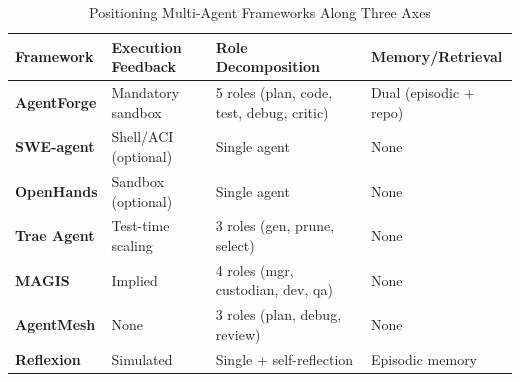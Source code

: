 \documentclass[journal]{IEEEtran}
\begin{document}
\begin{table}[t]
\centering
\caption{Positioning Multi-Agent Frameworks Along Three Axes}
\label{tab:frameworks_axes}
\small
\setlength{\tabcolsep}{5pt} %
\renewcommand{\arraystretch}{1.25} %

\begin{tabular}{@{} l p{3.5cm} p{3.5cm} p{3.5cm} @{}}
\toprule
\textbf{Framework} %
  & \textbf{Execution Feedback} %
  & \textbf{Role Decomposition} %
  & \textbf{Memory/Retrieval} \\ %
\midrule

\textbf{AgentForge} %
  & Mandatory sandbox %
  & 5 roles (plan, code, test, debug, critic) %
  & Dual (episodic + repo) \\ %

\textbf{SWE-agent} %
  & Shell/ACI (optional) %
  & Single agent %
  & None \\ %

\textbf{OpenHands} %
  & Sandbox (optional) %
  & Single agent %
  & None \\ %

\textbf{Trae Agent} %
  & Test-time scaling %
  & 3 roles (gen, prune, select) %
  & None \\ %

\textbf{MAGIS} %
  & Implied %
  & 4 roles (mgr, custodian, dev, qa) %
  & None \\ %

\textbf{AgentMesh} %
  & None %
  & 3 roles (plan, debug, review) %
  & None \\ %

\textbf{Reflexion} %
  & Simulated %
  & Single + self-reflection %
  & Episodic memory \\ %

\bottomrule
\end{tabular}
\end{table}
\end{document}
